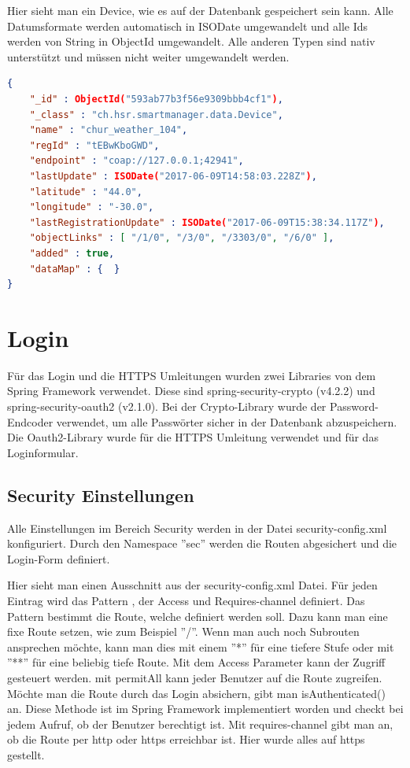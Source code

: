 Hier sieht man ein Device, wie es auf der Datenbank gespeichert sein kann. Alle Datumsformate werden automatisch in ISODate umgewandelt und alle Ids werden von String in ObjectId umgewandelt. Alle anderen Typen sind nativ unterstützt und müssen nicht weiter umgewandelt werden.
\begin{lstlisting}[language=json]
{ 
	"_id" : ObjectId("593ab77b3f56e9309bbb4cf1"), 
	"_class" : "ch.hsr.smartmanager.data.Device", 
	"name" : "chur_weather_104", 
	"regId" : "tEBwKboGWD", 
	"endpoint" : "coap://127.0.0.1;42941", 
	"lastUpdate" : ISODate("2017-06-09T14:58:03.228Z"), 
	"latitude" : "44.0", 
	"longitude" : "-30.0", 
	"lastRegistrationUpdate" : ISODate("2017-06-09T15:38:34.117Z"),
	"objectLinks" : [ "/1/0", "/3/0", "/3303/0", "/6/0" ], 
	"added" : true, 
	"dataMap" : {  } 
}
\end{lstlisting}

\newpage

\section{Login}
Für das Login und die HTTPS Umleitungen wurden zwei Libraries von dem Spring Framework verwendet.
Diese sind spring-security-crypto (v4.2.2) und spring-security-oauth2 (v2.1.0). Bei der Crypto-Library wurde der Password-Endcoder verwendet, um alle Passwörter sicher in der Datenbank abzuspeichern. Die Oauth2-Library wurde für die HTTPS Umleitung verwendet und für das Loginformular.

\subsection{Security Einstellungen}
Alle Einstellungen im Bereich Security werden in der Datei security-config.xml konfiguriert. Durch den Namespace ''sec'' werden die Routen abgesichert und die Login-Form definiert.

Hier sieht man einen Ausschnitt aus der security-config.xml Datei. Für jeden Eintrag wird das Pattern , der Access und Requires-channel definiert. Das Pattern bestimmt die Route, welche definiert werden soll. Dazu kann man eine fixe Route setzen, wie zum Beispiel ''/''. Wenn man auch noch Subrouten ansprechen möchte, kann man dies mit einem ''*'' für eine tiefere Stufe oder mit ''**'' für eine beliebig tiefe Route. 
Mit dem Access Parameter kann der Zugriff gesteuert werden. mit permitAll kann jeder Benutzer auf die Route zugreifen. Möchte man die Route durch das Login absichern, gibt man isAuthenticated() an. Diese Methode ist im Spring Framework implementiert worden und checkt bei jedem Aufruf, ob der Benutzer berechtigt ist. Mit requires-channel gibt man an, ob die Route per http oder https erreichbar ist. Hier wurde alles auf https gestellt.

